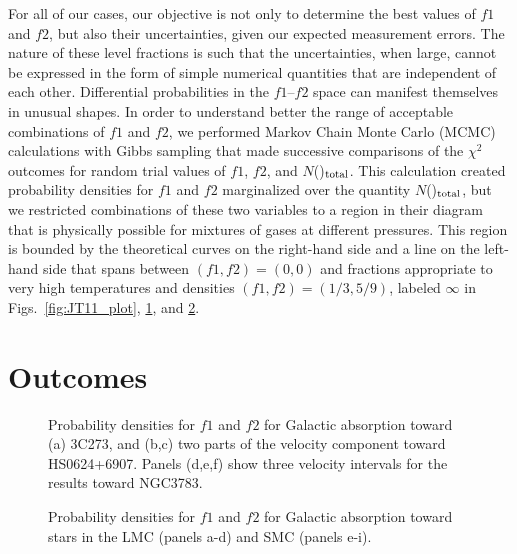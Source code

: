 \documentclass[modern]{aastex63}
\begin{document}
For all of our cases, our objective is not only to determine the best values of $f1$ and $f2$, but 
also their uncertainties, given our expected measurement errors.  The nature of these level 
fractions is such that the uncertainties, when large, cannot be expressed in the form of simple 
numerical quantities that are independent of each other.  Differential probabilities in the
$f1$--$f2$ space can manifest themselves in unusual shapes.  In order to understand better the 
range of acceptable combinations of $f1$ and $f2$, we performed Markov Chain Monte Carlo 
(MCMC) calculations with Gibbs sampling that made successive comparisons of the $\chi^2$ 
outcomes for random trial values of $f1$, $f2$, and $N$()$_{\rm total}$.  This 
calculation created probability densities for $f1$ and $f2$ marginalized over the quantity 
$N$()$_{\rm total}$, but we restricted combinations of these two variables to a 
region in their diagram that is physically possible for mixtures of gases at different pressures.  
This region is bounded by the theoretical curves on the right-hand side and a line on the
left-hand side that spans between $(f1,f2)=(0,0)$ and fractions appropriate to very high 
temperatures and densities $(f1,f2)=(1/3,5/9)$, labeled $\infty$ in Figs.~\ref{fig:JT11_plot},
\ref{fig:prob_plots1}, and \ref{fig:prob_plots2}.

\section{Outcomes}\label{sec:outcomes}

\begin{figure}
\caption{Probability densities for $f1$ and $f2$ for  Galactic absorption toward (a) 
3C273, and (b,c) two parts of the velocity component toward HS0624+6907.  Panels (d,e,f) 
show three velocity intervals for the results toward NGC3783.\label{fig:prob_plots1}}
\end{figure}
\begin{figure}

\caption{Probability densities for $f1$ and $f2$ for  Galactic absorption toward stars 
in the LMC (panels a-d) and SMC (panels e-i).\label{fig:prob_plots2}}
\end{figure}
\end{document}
